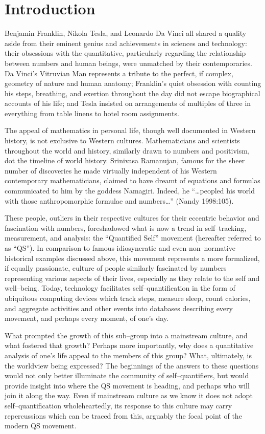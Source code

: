 \documentclass{article}
\begin{document}
\section*{Introduction}
Benjamin Franklin,
Nikola Tesla,
and Leonardo Da Vinci all shared a quality aside from their eminent genius and achievements in sciences and technology:
their obsessions with the quantitative,
particularly regarding the relationship between numbers and human beings,
were unmatched by their contemporaries.
Da Vinci's Vitruvian Man represents a tribute to the perfect,
if complex,
geometry of nature and human anatomy;
Franklin's quiet obsession with counting his steps,
breathing,
and exertion throughout the day did not escape biographical accounts of his life;
and Tesla insisted on arrangements of multiples of three in everything from table linens to hotel room assignments.

The appeal of mathematics in personal life,
though well documented in Western history,
is not exclusive to Western cultures.
Mathematicians and scientists throughout the world and history,
similarly drawn to numbers and positivism,
dot the timeline of world history.
Srinivasa Ramanujan,
famous for the sheer number of discoveries he made virtually independent of his Western contemporary mathematicians,
claimed to have dreamt of equations and formulas communicated to him by the goddess Namagiri.
Indeed,
he ``\dots peopled his world with those anthropomorphic formulae and numbers\dots''
(Nandy 1998:105).

These people,
outliers in their respective cultures for their eccentric behavior and fascination with numbers,
foreshadowed what is now a trend in self--tracking,
measurement,
and analysis:
the ``Quantified Self'' movement
(hereafter referred to as ``QS'').
In comparison to famous idiosyncratic and even non--normative historical examples discussed above,
this movement represents a more formalized,
if equally passionate,
culture of people similarly fascinated by numbers representing various aspects of their lives,
especially as they relate to the self and well--being.
Today,
technology facilitates self--quantification in the form of ubiquitous computing devices which track steps,
measure sleep,
count calories,
and aggregate activities and other events into databases describing every movement,
and perhaps every moment,
of one's day.

What prompted the growth of this sub--group into a mainstream culture,
and what fostered that growth? Perhaps more importantly,
why does a quantitative analysis of one's life appeal to the members of this group? What,
ultimately,
is the worldview being expressed? The beginnings of the answers to these questions would not only better illuminate the community of self--quantifiers,
but would provide insight into where the QS movement is heading,
and perhaps who will join it along the way.
Even if mainstream culture as we know it does not adopt self--quantification wholeheartedly,
its response to this culture may carry repercussions which can be traced from this,
arguably the focal point of the modern QS movement.
\end{document}
